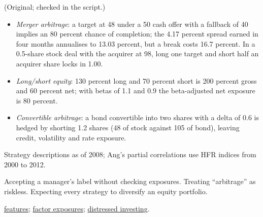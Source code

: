 \begin{qfmethod}
 (Original; checked in the script.)
\begin{itemize}
\item \emph{Merger arbitrage}: a target at 48 under a 50 cash offer with a fallback of 40 implies an 80 percent chance of completion; the 4.17 percent spread earned in four months annualises to 13.03 percent, but a break costs 16.7 percent. In a 0.5-share stock deal with the acquirer at 98, long one target and short half an acquirer share locks in 1.00.
\item \emph{Long/short equity}: 130 percent long and 70 percent short is 200 percent gross and 60 percent net; with betas of 1.1 and 0.9 the beta-adjusted net exposure is 80 percent.
\item \emph{Convertible arbitrage}: a bond convertible into two shares with a delta of 0.6 is hedged by shorting 1.2 shares (48 of stock against 105 of bond), leaving credit, volatility and rate exposure.
\end{itemize}

 Strategy descriptions as of 2008; Ang's partial correlations use HFR indices from 2000 to 2012.

 Accepting a manager's label without checking exposures. Treating ``arbitrage'' as riskless. Expecting every strategy to diversify an equity portfolio.

 \hyperref[def:hedge-fund-features]{features}; \hyperref[meth:hedge-fund-factor-exposures]{factor exposures}; \hyperref[meth:special-situations-distressed]{distressed investing}.

\end{qfmethod}

